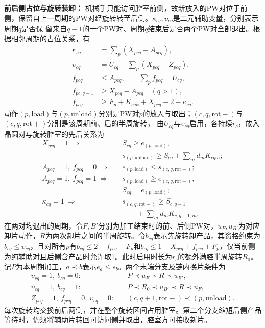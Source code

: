 \documentclass[final,5p,times,twocolumn]{elsarticle}
\begin{document}
\noindent\textbf{前后侧占位与旋转装卸：}
机械手只能访问腔室前侧，故新放入的PW对位于前侧，保留自上一周期的PW对经旋转转至后侧。$\kappa_{cq},\upsilon_{cq}$是二元辅助变量，分别表示周期$q$是否保
留来自$q-1$的一个PW对、周期$q$结束后是否两个PW对全部退出。根据相邻周期的占位关系，有
\begin{equation}
\begin{aligned}
\kappa_{cq}&=\sum_p(X_{pcq}-A_{pcq}),\\
\upsilon_{cq}&=U_{cq}-\sum_p(X_{pcq}-Z_{pcq}),\\
f_{pcq}&\le A_{pcq},\qquad\sum_pf_{pcq}=U_{cq},\\
f_{pc,q-1}&\ge X_{pcq}-A_{pcq}\quad(q>1),\\
f_{pcq}&\ge F_p+K_{cq\psi}+X_{pcq}-2-\kappa_{cq}.
\end{aligned}
\label{eq:cycle-side-cn}
\end{equation}
动作$(p,\mathrm{load})$与$(p,\mathrm{unload})$分别是PW对$p$的放入与取出；$(c,q,\mathrm{rot-})$与$(c,q,\mathrm{rot+})$分别是该周期前、后的半周旋转，
由$U_{cq}$与$\upsilon_{cq}$启用，各持续$r_c$，放入晶圆对与旋转腔室的先后关系为
\begin{equation}
\begin{aligned}
X_{pcq}=1\ \Rightarrow\quad
&S_{cq}\ge e_{(p,\mathrm{load})},\\
&s_{(p,\mathrm{unload})}\ge S_{cq}+\sum_m d_mK_{cqm};\\
A_{pcq}=1,\ f_{pcq}=0\ \Rightarrow\quad
&e_{(p,\mathrm{load})}\le s_{(c,q,\mathrm{rot-})};\\
A_{pcq}=1,\ f_{pcq}=1\ \Rightarrow\quad
&s_{(p,\mathrm{load})}\ge e_{(c,q,\mathrm{rot-})},\\
&S_{cq}=e_{(p,\mathrm{load})};\\
\kappa_{cq}=1\ \Rightarrow\quad
&s_{(c,q,\mathrm{rot-})}\ge S_{c,q-1}\\
&\qquad+\sum_m d_mK_{c,q-1,m}.
\end{aligned}
\label{eq:cycle-load-cn}
\end{equation}
在两对均退出的周期，令$F,B'$分别为加工结束时的前、后侧PW对，$u_F,u_{B'}$为对应卸片动作，$R$为两次卸片之间的半周旋转。令$b_{cq}$表示先旋转卸产品，其资格约束为$b_{cq}\le\upsilon_{cq}$，且对所有$p$有$b_{cq}\le2-f_{pcq}-F_p$和$b_{cq}\le1-X_{pcq}+f_{pcq}+F_p$，仅当前侧为纯辅助对且后侧含产品时允许取1。此时启用时长为$r_c$的额外满腔半周旋转$R_0$。记$P$为本周期加工，$a\prec b$表示$e_a\le s_b$。两个末端分支及链内换片条件为
\begin{equation}
\begin{aligned}
\upsilon_{cq}=1,\ b_{cq}=0:\quad
   &P\prec u_F\prec R\prec u_{B'},\\
\upsilon_{cq}=1,\ b_{cq}=1:\quad
   &P\prec R_0\prec u_{B'}\prec R\prec u_F,\\
Z_{pcq}=1,\ f_{pcq}=0,\ \upsilon_{cq}=0:\quad
   & (c,q+1,\mathrm{rot-})\prec(p,\mathrm{unload}).
\end{aligned}
\label{eq:cycle-unload-cn}
\end{equation}
每次旋转均交换前后两侧，并在整个旋转区间占用腔室。第二个分支缩短后侧产品等待时，仍须将辅助片转回可访问侧并取出，腔室方可接收新片。
\end{document}
